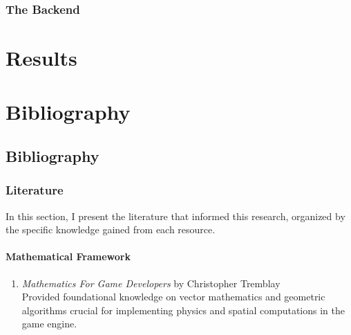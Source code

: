 \documentclass[12pt twoside]{report}
\begin{document}
        \section*{The Backend}
          
          \pagebreak
          

          
          \pagebreak
          
          

          \pagebreak

          

    \part{Results}
    


    \part{Bibliography}
      \chapter*{Bibliography}

        \section*{Literature}

In this section, I present the literature that informed this research, organized by the specific knowledge gained from each resource.
        \subsection*{Mathematical Framework}
        \begin{enumerate}
            \item \textit{Mathematics For Game Developers} by Christopher Tremblay \\
            Provided foundational knowledge on vector mathematics and geometric algorithms crucial for implementing physics and spatial computations in the game engine.
        \end{enumerate}
\end{document}
